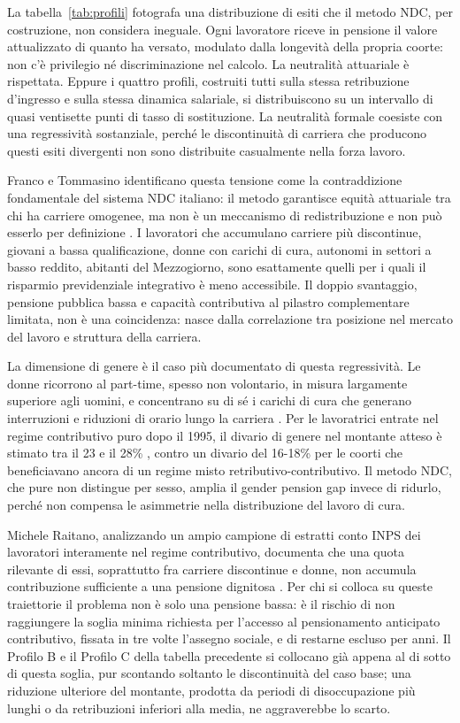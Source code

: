 \noindent
La tabella~\ref{tab:profili} fotografa una distribuzione di esiti
che il metodo NDC, per costruzione, non considera ineguale. Ogni
lavoratore riceve in pensione il valore attualizzato di quanto ha
versato, modulato dalla longevità della propria coorte: non c'è
privilegio né discriminazione nel calcolo. La neutralità attuariale è
rispettata. Eppure i quattro profili, costruiti tutti sulla stessa retribuzione
d'ingresso e sulla stessa dinamica salariale, si distribuiscono su un intervallo
di quasi ventisette punti di tasso di sostituzione. La neutralità formale coesiste con una regressività sostanziale,
perché le discontinuità di carriera che producono questi esiti divergenti
non sono distribuite casualmente nella forza lavoro.

\medskip
\noindent
Franco e Tommasino identificano questa tensione come la contraddizione
fondamentale del sistema NDC italiano: il metodo garantisce equità
attuariale tra chi ha carriere omogenee, ma non è un meccanismo di
redistribuzione e non può esserlo per definizione
\cite{FrancoTommasino2020}. I lavoratori che accumulano carriere
più discontinue, giovani a bassa qualificazione, donne con carichi
di cura, autonomi in settori a basso reddito, abitanti del
Mezzogiorno, sono esattamente quelli per i quali il risparmio
previdenziale integrativo è meno accessibile. Il doppio svantaggio,
pensione pubblica bassa e capacità contributiva al pilastro
complementare limitata, non è una coincidenza: nasce dalla correlazione
tra posizione nel mercato del lavoro e struttura della carriera.

\medskip
\noindent
La dimensione di genere è il caso più documentato di questa
regressività. Le donne ricorrono al part-time, spesso non volontario, in misura
largamente superiore agli uomini, e concentrano su di sé i carichi di cura
che generano interruzioni e riduzioni di orario lungo la carriera
\cite{INPS2025}.
Per le lavoratrici entrate nel regime contributivo puro dopo il 1995,
il divario di genere nel montante atteso è stimato tra il 23 e il 28\%
\cite{MEF_RGS2025}, contro un divario del 16-18\% per le coorti
che beneficiavano ancora di un regime misto retributivo-contributivo.
Il metodo NDC, che pure non distingue per sesso, amplia il gender
pension gap invece di ridurlo, perché non compensa le asimmetrie
nella distribuzione del lavoro di cura.

\medskip
\noindent
Michele Raitano, analizzando un ampio campione di estratti conto INPS dei
lavoratori interamente nel regime contributivo, documenta che una quota
rilevante di essi, soprattutto fra carriere discontinue e donne, non accumula
contribuzione sufficiente a una pensione dignitosa \cite{Raitano2020}. Per chi
si colloca su queste traiettorie il problema non è solo una pensione bassa: è
il rischio di non raggiungere la soglia minima richiesta per l'accesso al
pensionamento anticipato contributivo, fissata in tre volte l'assegno sociale,
e di restarne escluso per anni. Il Profilo B e il Profilo C della tabella
precedente si collocano già appena al di sotto di questa soglia, pur scontando
soltanto le discontinuità del caso base; una riduzione ulteriore del
montante, prodotta da periodi di disoccupazione più lunghi o da
retribuzioni inferiori alla media, ne aggraverebbe lo scarto.

